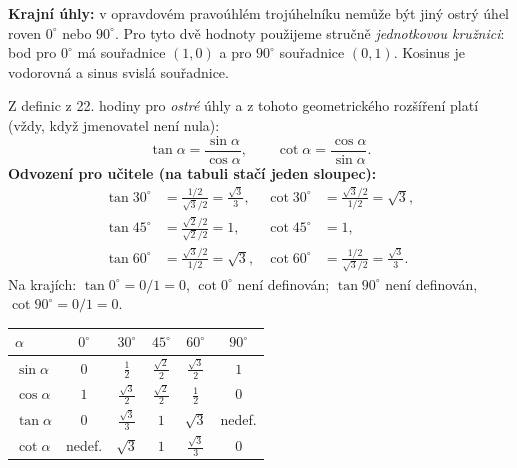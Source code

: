 \documentclass[11pt,a4paper]{article}
\begin{document}
\newpage
{}
\textbf{Krajní úhly:} v opravdovém pravoúhlém trojúhelníku nemůže být
jiný ostrý úhel roven $0^\circ$ nebo $90^\circ$. Pro tyto dvě hodnoty
použijeme stručně \emph{jednotkovou kružnici}: bod pro $0^\circ$ má
souřadnice $(1,0)$ a pro $90^\circ$ souřadnice $(0,1)$.
Kosinus je vodorovná a sinus svislá souřadnice.
\begin{center}
\end{center}
Z definic z 22. hodiny pro \emph{ostré} úhly a z tohoto geometrického
rozšíření platí (vždy, když jmenovatel není nula):
\[
\tan\alpha=\frac{\sin\alpha}{\cos\alpha},\qquad
\cot\alpha=\frac{\cos\alpha}{\sin\alpha}.
\]
\textbf{Odvození pro učitele (na tabuli stačí jeden sloupec):}
\[
\begin{aligned}
\tan30^\circ&=\frac{1/2}{\sqrt3/2}=\frac{\sqrt3}{3}, &
\cot30^\circ&=\frac{\sqrt3/2}{1/2}=\sqrt3,\\
\tan45^\circ&=\frac{\sqrt2/2}{\sqrt2/2}=1, &
\cot45^\circ&=1,\\
\tan60^\circ&=\frac{\sqrt3/2}{1/2}=\sqrt3, &
\cot60^\circ&=\frac{1/2}{\sqrt3/2}=\frac{\sqrt3}{3}.
\end{aligned}
\]
Na krajích: $\tan0^\circ=0/1=0$, $\cot0^\circ$ není definován;
$\tan90^\circ$ není definován, $\cot90^\circ=0/1=0$.
\begin{center}
\renewcommand{\arraystretch}{1.35}
\begin{tabular}{@{}lccccc@{}}\toprule
$\alpha$ & $0^\circ$ & $30^\circ$ & $45^\circ$ & $60^\circ$ & $90^\circ$ \\ \midrule
$\sin\alpha$ & $0$ & $\frac12$ & $\frac{\sqrt2}{2}$ & $\frac{\sqrt3}{2}$ & $1$ \\
$\cos\alpha$ & $1$ & $\frac{\sqrt3}{2}$ & $\frac{\sqrt2}{2}$ & $\frac12$ & $0$ \\
$\tan\alpha$ & $0$ & $\frac{\sqrt3}{3}$ & $1$ & $\sqrt3$ & nedef. \\
$\cot\alpha$ & nedef. & $\sqrt3$ & $1$ & $\frac{\sqrt3}{3}$ & $0$ \\ \bottomrule
\end{tabular}
\end{center}
\end{document}
